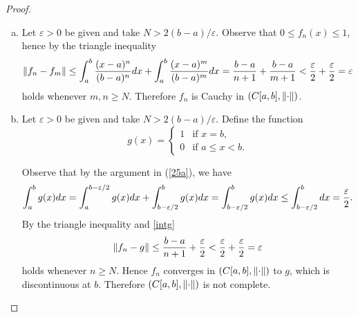 \documentclass[10pt]{amsart}
\begin{document}
\begin{ex25}{}
\begin{proof}
\begin{enumerate}[(a)]
      The remaining axioms follow from the triangle inequality for $\abs{\cdot}$ and calculus.
      Namely, $\abs{(f + g)(x)} \leq \abs{f(x)} + \abs{g(x)}$ implies 
      $$\norm{f+g} = \int_a^b\abs{(f+g)(x)}dx \leq \int_a^b\abs{f(x)}dx + \int_a^b\abs{g(x)}dx = \norm{f} + \norm{g},$$
      and for any $a \in \mathbb{R}$, $$\norm{af} = \abs{a}\int_a^b\abs{f(x)}dx = \abs{a}\norm{f}.$$
    \item
      Let $\varepsilon > 0$ be given and take $N > 2(b-a)/\varepsilon$.
      Observe that $0 \leq f_n(x) \leq 1$, hence by the triangle inequality
      $$\lVert f_n - f_m\rVert \leq \int_a^b \frac{(x-a)^n}{(b-a)^n}dx + \int_a^b\frac{(x-a)^m}{(b-a)^m}dx = \frac{b-a}{n+1} + \frac{b-a}{m+1} < \frac{\varepsilon}{2} + \frac{\varepsilon}{2}= \varepsilon$$
      holds whenever $m,n \geq N$.
      Therefore $f_n$ is Cauchy in $(C[a,b], \lVert\cdot\rVert)$.
    \item
      Let $\varepsilon > 0$ be given and take $N > 2(b-a)/\varepsilon$.
      Define the function
      $$g(x) = 
      \left\{
      \begin{array}{ll}
        1 & \text{if } x = b,\\
        0 & \text{if } a \leq x < b.
      \end{array}
      \right.$$

      Observe that by the argument in (\ref{25a}), we have
      \begin{equation}\label{intg} 
        \int_a^b g(x)dx\\ = \int_a^{b-\varepsilon/2} g(x)dx\\ + \int_{b-\varepsilon/2}^bg(x)dx = \int_{b-\varepsilon/2}^bg(x)dx \leq \int_{b-\varepsilon/2}^b dx = \frac{\varepsilon}{2}.
      \end{equation}
      By the triangle inequality and \eqref{intg}
      $$
      \lVert f_n - g\rVert \leq \frac{b-a}{n+1} + \frac{\varepsilon}{2} < \frac{\varepsilon}{2} + \frac{\varepsilon}{2} = \varepsilon
      $$
      holds whenever $n \geq N$.
      Hence $f_n$ converges in $(C[a,b], \lVert\cdot\rVert)$ to $g$, which is discontinuous at $b$.
      Therefore $(C[a,b], \lVert\cdot\rVert)$ is not complete.
    \end{enumerate}
  \end{proof}
\end{ex25}{}
\end{document}

